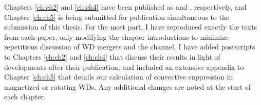 Chapters \ref{ch:ch2} and \ref{ch:ch4} have been published as \cite{zhu+13} and \cite{zhu+15}, respectively, and Chapter \ref{ch:ch5} is being submitted for publication simultaneous to the submission of this thesis.  For the most part, I have reproduced exactly the texts from each paper, only modifying the chapter introductions to minimize repetitious discussion of WD mergers and the \citeal{vkercj10} channel.  I have added postscripts to Chapters \ref{ch:ch2} and \ref{ch:ch4} that discuss their results in light of developments after their publication, and included an extensive appendix to Chapter \ref{ch:ch5} that details our calculation of convective suppression in magnetized or rotating WDs.  Any additional changes are noted at the start of each chapter.

